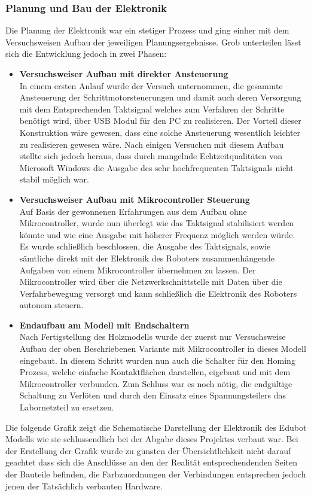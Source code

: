 \subsubsection{Planung und Bau der Elektronik}
Die Planung der Elektronik war ein stetiger Prozess und ging einher mit dem Versuchsweisen Aufbau der jeweiligen Planungsergebnisse. Grob unterteilen lässt sich die Entwicklung jedoch in zwei Phasen:
\begin{itemize}
\item \textbf{Versuchsweiser Aufbau mit direkter Ansteuerung}\\
In einem ersten Anlauf wurde der Versuch unternommen, die gesammte Ansteuerung der Schrittmotorsteuerungen und damit auch deren Versorgung mit dem Entsprechenden Taktsignal welches zum Verfahren der Schritte benötigt wird, über USB Modul für den PC zu realisieren. Der Vorteil dieser Konstruktion wäre gewesen, dass eine solche Ansteuerung wesentlich leichter zu realisieren gewesen wäre. Nach einigen Versuchen mit diesem Aufbau stellte sich jedoch heraus, dass durch mangelnde Echtzeitqualitäten von Microsoft Windows die Ausgabe des sehr hochfrequenten Taktsignals nicht stabil möglich war.
\item \textbf{Versuchsweiser Aufbau mit Mikrocontroller Steuerung}\\
Auf Basis der gewonnenen Erfahrungen aus dem Aufbau ohne Mikrocontroller, wurde nun überlegt wie das Taktsignal stabilisiert werden könnte und wie eine Ausgabe mit höherer Frequenz möglich werden würde. Es wurde schließlich beschlossen, die Ausgabe des Taktsignals, sowie sämtliche direkt mit der Elektronik des Roboters zusammenhängende Aufgaben von einem Mikrocontroller übernehmen zu lassen. Der Mikrocontroller wird über die Netzwerkschnittstelle mit Daten über die Verfahrbewegung versorgt und kann schließlich die Elektronik des Roboters autonom steuern.
\item \textbf{Endaufbau am Modell mit Endschaltern}\\
Nach Fertigstellung des Holzmodells wurde der zuerst nur Versuchsweise Aufbau der oben Beschriebenen Variante mit Mikrocontroller in dieses Modell eingebaut. In diesem Schritt wurden nun auch die Schalter für den Homing Prozess, welche einfache Kontaktflächen darstellen, eigebaut und mit dem Mikrocontroller verbunden.
Zum Schluss war es noch nötig, die endgültige Schaltung zu Verlöten und durch den Einsatz eines Spannungsteilers das Labornetzteil zu ersetzen.
\end{itemize}
Die folgende Grafik zeigt die Schematische Darstellung der Elektronik des Edubot Modells wie sie schlussendlich bei der Abgabe dieses Projektes verbaut war. Bei der Erstellung der Grafik wurde zu gunsten der Übersichtlichkeit nicht darauf geachtet dass sich die Anschlüsse an den der Realität entsprechendenden Seiten der Bauteile befinden, die Farbzuordnungen der Verbindungen entsprechen jedoch jenen der Tatsächlich verbauten Hardware.
